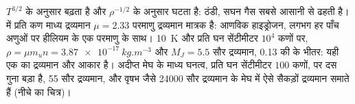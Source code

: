  $T^{3/2}$ के अनुसार बढ़ता है और $\rho^{-1/2}$ के अनुसार घटता है: ठंडी, सघन गैस
सबसे आसानी से ढहती है।  में प्रति कण माध्य द्रव्यमान
$\mu = 2.33$ परमाणु द्रव्यमान मात्रक है: आणविक हाइड्रोजन, लगभग हर पाँच अणुओं पर हीलियम
के एक परमाणु के साथ। \qty{10}{K} और प्रति घन सेंटीमीटर $10^4$ कणों पर,
$\rho = \mu m_u n = \qty{3.87e-17}{kg.m^{-3}}$ और
$M_J = 5.5$ सौर द्रव्यमान, \qty{0.13}{\parsec} की  के भीतर:
यही एक  का द्रव्यमान और आकार है। अदीप्त मेघ के माध्य घनत्व,
प्रति घन सेंटीमीटर $100$ कणों, पर  दस गुना बड़ा है, 55
सौर द्रव्यमान, और वृषभ जैसे \num{24000} सौर द्रव्यमान के मेघ में
ऐसे सैकड़ों द्रव्यमान समाते हैं (नीचे का चित्र)।

